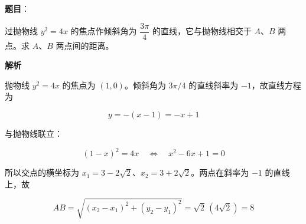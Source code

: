 \begin{answer}

\gkanswer{答案（2）：$[2,3)\cup(3,5)$。}






\end{answer}
\begin{answer}

\textbf{题目}：

过抛物线 $y^2=4x$ 的焦点作倾斜角为 $\dfrac{3\pi}{4}$ 的直线，它与抛物线相交于 $A\text{、}B$ 两点。求 $A\text{、}B$ 两点间的距离。

\textbf{解析}

抛物线 $y^2=4x$ 的焦点为 $(1,0)$。倾斜角为 $3\pi/4$ 的直线斜率为 $-1$，故直线方程为

\nopagebreak[4]
\[
y=-(x-1)=-x+1
\]

与抛物线联立：

\nopagebreak[4]
\[
(1-x)^2=4x
\quad\Longleftrightarrow\quad
x^2-6x+1=0
\]

所以交点的横坐标为 $x_1=3-2\sqrt2$、$x_2=3+2\sqrt2$。两点在斜率为 $-1$ 的直线上，故

\nopagebreak[4]
\[
AB=\sqrt{(x_2-x_1)^2+(y_2-y_1)^2}
=\sqrt2\,(4\sqrt2)=8
\]


\end{answer}
